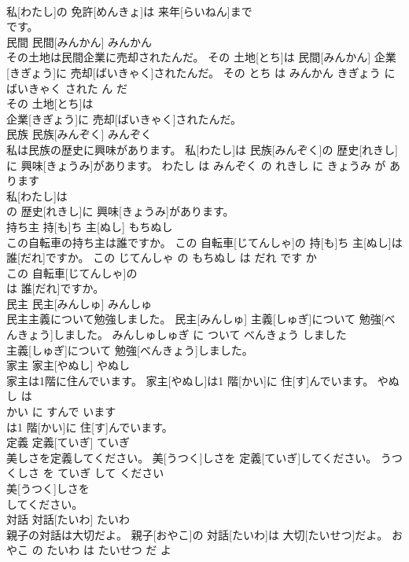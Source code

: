 \documentclass[8pt]{extreport}
\begin{document}
\begin{CJK}{UTF8}{min}
\\	私[わたし]の 免許[めんきょ]は 来年[らいねん]まで
\\	です。			
\\	民間	民間[みんかん]	みんかん	
\\	その土地は民間企業に売却されたんだ。	その 土地[とち]は 民間[みんかん] 企業[きぎょう]に 売却[ばいきゃく]されたんだ。	その とち は みんかん きぎょう に ばいきゃく された ん だ	
\\	その 土地[とち]は
\\	企業[きぎょう]に 売却[ばいきゃく]されたんだ。			
\\	民族	民族[みんぞく]	みんぞく	
\\	私は民族の歴史に興味があります。	私[わたし]は 民族[みんぞく]の 歴史[れきし]に 興味[きょうみ]があります。	わたし は みんぞく の れきし に きょうみ が あります	
\\	私[わたし]は
\\	の 歴史[れきし]に 興味[きょうみ]があります。			
\\	持ち主	持[も]ち 主[ぬし]	もちぬし	
\\	この自転車の持ち主は誰ですか。	この 自転車[じてんしゃ]の 持[も]ち 主[ぬし]は 誰[だれ]ですか。	この じてんしゃ の もちぬし は だれ です か	
\\	この 自転車[じてんしゃ]の
\\	は 誰[だれ]ですか。			
\\	民主	民主[みんしゅ]	みんしゅ	
\\	民主主義について勉強しました。	民主[みんしゅ] 主義[しゅぎ]について 勉強[べんきょう]しました。	みんしゅしゅぎ に ついて べんきょう しました	
\\	主義[しゅぎ]について 勉強[べんきょう]しました。			
\\	家主	家主[やぬし]	やぬし	
\\	家主は1階に住んでいます。	家主[やぬし]は1 階[かい]に 住[す]んでいます。	やぬし は 
\\	かい に すんで います	
\\	は1 階[かい]に 住[す]んでいます。			
\\	定義	定義[ていぎ]	ていぎ	
\\	美しさを定義してください。	美[うつく]しさを 定義[ていぎ]してください。	うつくしさ を ていぎ して ください	
\\	美[うつく]しさを
\\	してください。			
\\	対話	対話[たいわ]	たいわ	
\\	親子の対話は大切だよ。	親子[おやこ]の 対話[たいわ]は 大切[たいせつ]だよ。	おやこ の たいわ は たいせつ だ よ	

\end{CJK}
\end{document}

